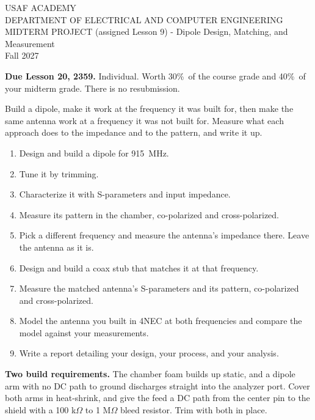 \documentclass{exam}
\def\thisterm{\thisTermIn}
\def\thisterm{Fall 2027}
\def\fOne{915}
\def\duedate{Lesson 20, 2359}
\def\projweight{30\%}
\def\midweight{40\%}
\newcommand{\head}[1]{\par\vspace{6pt}{\large\bfseries #1}\par\vspace{-2pt}}
\begin{document}
\pagestyle{headandfoot}

\begin{center}
USAF ACADEMY \\
DEPARTMENT OF ELECTRICAL AND COMPUTER ENGINEERING \\
MIDTERM PROJECT (assigned Lesson 9) - Dipole Design, Matching, and Measurement \\
\thisterm \\[2mm]
\end{center}

\textbf{Due \duedate.} Individual. Worth \projweight\ of the course grade and
\midweight\ of your midterm grade. There is no resubmission.

\head{The Assignment}

Build a dipole, make it work at the frequency it was built for, then make the
same antenna work at a frequency it was not built for. Measure what each
approach does to the impedance and to the pattern, and write it up.

\begin{enumerate}[nosep]
	\item Design and build a dipole for \fOne\ MHz.
	\item Tune it by trimming.
	\item Characterize it with S-parameters and input impedance.
	\item Measure its pattern in the chamber, co-polarized and cross-polarized.
	\item Pick a different frequency and measure the antenna's impedance there.
	      Leave the antenna as it is.
	\item Design and build a coax stub that matches it at that frequency.
	\item Measure the matched antenna's S-parameters and its pattern, co-polarized
	      and cross-polarized.
	\item Model the antenna you built in 4NEC at both frequencies and compare the
	      model against your measurements.
	\item Write a report detailing your design, your process, and your analysis.
\end{enumerate}

\textbf{Two build requirements.} The chamber foam builds up static, and a
dipole arm with no DC path to ground discharges straight into the analyzer
port. Cover both arms in heat-shrink, and give the feed a DC path from the
center pin to the shield with a 100 k$\Omega$ to 1 M$\Omega$ bleed resistor. Trim
with both in place.
\end{document}
